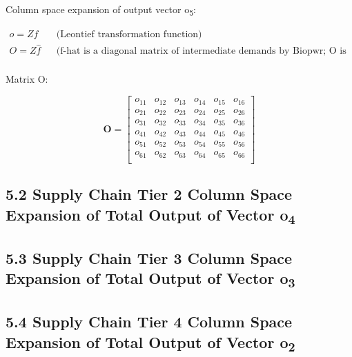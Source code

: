 \documentclass[
  letterpaper,
  DIV=11,
  numbers=noendperiod]{scrreprt}
\begin{document}
Column space expansion of output vector o\textsubscript{5}:

\[
\begin{align}
    o = Zf && \text{(Leontief transformation function)}\\
    O = Z\hat{f} && \text{(f-hat is a diagonal matrix of intermediate demands by Biopwr; O is the column space of o)}\\
\end{align}
\]

Matrix O:

\[\mathbf{O} = \left[\begin{array}
{rrr}
o_{11} & o_{12} & o_{13} & o_{14} & o_{15} & o_{16} \\
o_{21} & o_{22} & o_{23} & o_{24} & o_{25} & o_{26} \\
o_{31} & o_{32} & o_{33} & o_{34} & o_{35} & o_{36} \\
o_{41} & o_{42} & o_{43} & o_{44} & o_{45} & o_{46} \\
o_{51} & o_{52} & o_{53} & o_{54} & o_{55} & o_{56} \\
o_{61} & o_{62} & o_{63} & o_{64} & o_{65} & o_{66} \\
\end{array}\right]
\]

\subsection{\texorpdfstring{5.2 Supply Chain Tier 2 Column Space
Expansion of Total Output of Vector
o\textsubscript{4}}{5.2 Supply Chain Tier 2 Column Space Expansion of Total Output of Vector o4}}\label{supply-chain-tier-2-column-space-expansion-of-total-output-of-vector-o4}

\subsection{\texorpdfstring{5.3 Supply Chain Tier 3 Column Space
Expansion of Total Output of Vector
o\textsubscript{3}}{5.3 Supply Chain Tier 3 Column Space Expansion of Total Output of Vector o3}}\label{supply-chain-tier-3-column-space-expansion-of-total-output-of-vector-o3}

\subsection{\texorpdfstring{5.4 Supply Chain Tier 4 Column Space
Expansion of Total Output of Vector
o\textsubscript{2}}{5.4 Supply Chain Tier 4 Column Space Expansion of Total Output of Vector o2}}\label{supply-chain-tier-4-column-space-expansion-of-total-output-of-vector-o2}
\end{document}
